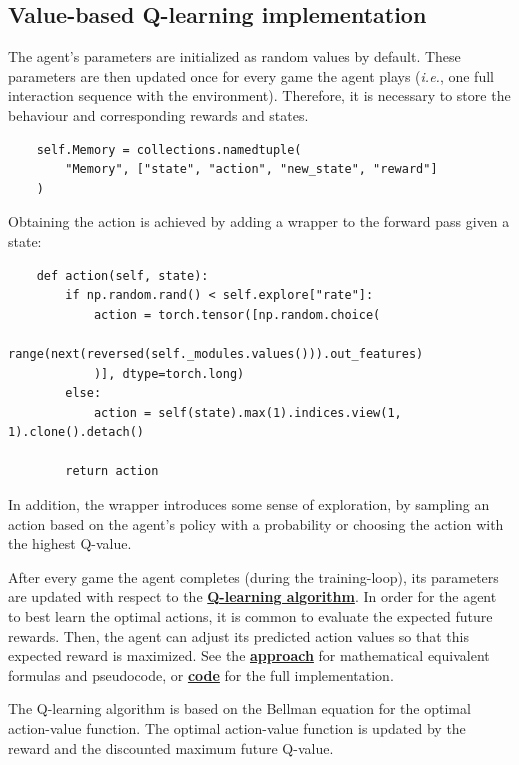 \documentclass{article}
\let\oldhyperlink\hyperlink
\renewcommand{\hyperlink}[2]{\oldhyperlink{#1}{\textbf{#2}}}
\renewenvironment{leftbar}[1][\hsize]{
    \def\FrameCommand{{\color{barcolor}\vrule width 0.5pt \hspace{10pt}}}
    \MakeFramed{\hsize#1 \advance\hsize-\width \FrameRestore}
}{\endMakeFramed}
\begin{document}
\subsection*{Value-based Q-learning implementation}
\begin{leftbar}

    The agent's parameters are initialized as random values by default. These parameters are then updated once for every game the agent plays (\textit{i.e.}, one full interaction sequence with the environment). Therefore, it is necessary to store the behaviour and corresponding rewards and states.

    \begin{lstlisting}
    self.Memory = collections.namedtuple(
        "Memory", ["state", "action", "new_state", "reward"]
    )
    \end{lstlisting}

    Obtaining the action is achieved by adding a wrapper to the forward pass given a state:

    \begin{lstlisting}
    def action(self, state):
        if np.random.rand() < self.explore["rate"]:
            action = torch.tensor([np.random.choice(
                range(next(reversed(self._modules.values())).out_features)
            )], dtype=torch.long)
        else:
            action = self(state).max(1).indices.view(1, 1).clone().detach()

        return action
    \end{lstlisting}

    In addition, the wrapper introduces some sense of exploration, by sampling an action based on the agent's policy with a probability or choosing the action with the highest Q-value.

    After every game the agent completes (during the training-loop), its parameters are updated with respect to the \hyperlink{sec:value-based-approach}{Q-learning algorithm}. In order for the agent to best learn the optimal actions, it is common to evaluate the expected future rewards. Then, the agent can adjust its predicted action values so that this expected reward is maximized. See the \hyperlink{sec:value-based-approach}{approach} for mathematical equivalent formulas and pseudocode, or \hyperlink{sec:code}{code} for the full implementation.

    The Q-learning algorithm is based on the Bellman equation for the optimal action-value function. The optimal action-value function is updated by the reward and the discounted maximum future Q-value.


\end{leftbar}
\end{document}

